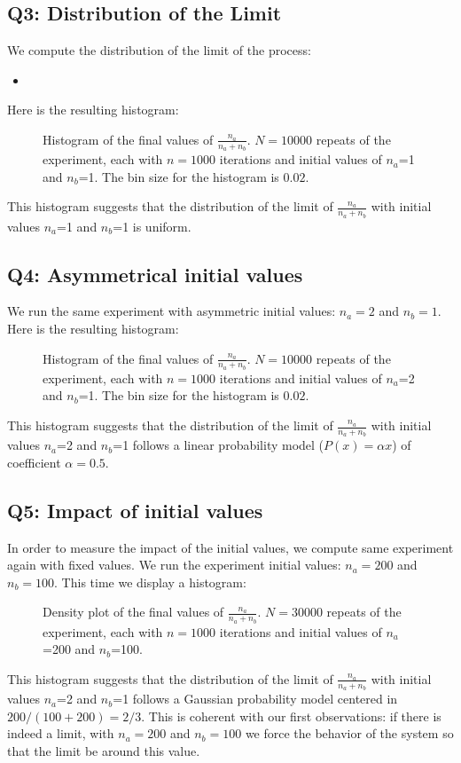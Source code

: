 \documentclass{beamer}
\newcommand{\Rscript}[2]{
    \begin{itemize}
        \item[]
    \end{itemize}
}
\begin{document}
\subsection*{Q3: Distribution of the Limit}
\label{sub:q3_distribution_of_the_limit}
We compute the distribution of the limit of the process:
\Rscript{src/exp2.R}{$10000$ iterations with $n_a$ and $n_b$ initially at $1$ and step-by-step output}
Here is the resulting histogram:
\begin{figure}[H]
    \centering
    \caption{Histogram of the final values of $\frac{n_a}{n_a+n_b}$. $N=10000$ repeats of the experiment, each with $n=1000$ iterations and initial values of $n_a$=1 and $n_b$=1. The bin size for the histogram is $0.02$.}
    \label{fig:hist}
\end{figure}
This histogram suggests that the distribution of the limit of $\frac{n_a}{n_a+n_b}$ with initial values $n_a$=1 and $n_b$=1 is uniform.

\subsection*{Q4: Asymmetrical initial values}
\label{sub:q4_asymetrical_initial_values}
We run the same experiment with asymmetric initial values: $n_a=2$ and $n_b=1$. Here is the resulting histogram:
\begin{figure}[H]
    \centering
    \caption{Histogram of the final values of $\frac{n_a}{n_a+n_b}$. $N=10000$ repeats of the experiment, each with $n=1000$ iterations and initial values of $n_a$=2 and $n_b$=1. The bin size for the histogram is $0.02$.}
    \label{fig:hist2}
\end{figure}
This histogram suggests that the distribution of the limit of $\frac{n_a}{n_a+n_b}$ with initial values $n_a$=2 and $n_b$=1 follows a linear probability model ($P(x)=\alpha x$) of coefficient $\alpha = 0.5$.

\subsection*{Q5: Impact of initial values}
\label{sub:q5_impact_of_initial_values}
In order to measure the impact of the initial values, we compute same experiment again with fixed values.
We run the experiment initial values: $n_a=200$ and $n_b=100$. This time we display a histogram:
\begin{figure}[H]
    \centering
    \caption{Density plot of the final values of $\frac{n_a}{n_a+n_b}$. $N=30000$ repeats of the experiment, each with $n=1000$ iterations and initial values of $n_a$=200 and $n_b$=100.}
    \label{fig:hist3}
\end{figure}
This histogram suggests that the distribution of the limit of $\frac{n_a}{n_a+n_b}$ with initial values $n_a$=2 and $n_b$=1 follows a Gaussian probability model centered in $200/(100+200)=2/3$. This is coherent  with our first observations: if there is indeed a limit, with $n_a=200$ and $n_b=100$ we force the behavior of the system so that the limit be around this value.
\end{document}
